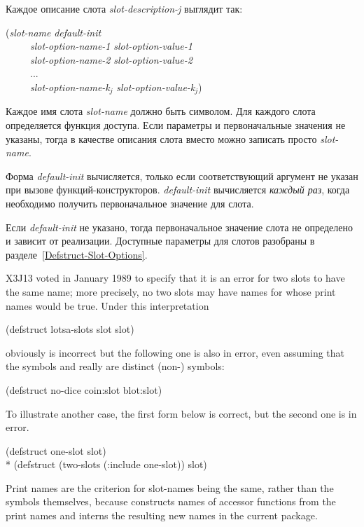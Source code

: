 \begin{defmac}
Каждое описание слота \emph{slot-description-j} выглядит так:
\begin{lisp}
(\emph{slot-name} \emph{default-init} \\
~~~~~\emph{slot-option-name-1} \emph{slot-option-value-1} \\
~~~~~\emph{slot-option-name-2} \emph{slot-option-value-2} \\
~~~~~... \\
~~~~~\emph{slot-option-name-k${}_{j}$} \emph{slot-option-value-k${}_{j}$})
\end{lisp}
Каждое имя слота \emph{slot-name} должно быть символом. Для каждого слота
определяется функция доступа. Если параметры и первоначальные значения не указаны,
тогда в качестве описания слота вместо  можно записать просто
\emph{slot-name}.

Форма \emph{default-init} вычисляется, только если соответствующий аргумент не
указан при вызове функций-конструкторов.
\emph{default-init} вычисляется \emph{каждый раз}, когда необходимо получить
первоначальное значение для слота.

Если \emph{default-init} не указано, тогда первоначальное значение слота не
определено и зависит от реализации. Доступные параметры для слотов разобраны в
разделе~\ref{Defstruct-Slot-Options}.

\begin{new}
X3J13 voted in January 1989
to specify that it is an error for
two slots to have the same name; more precisely, no two slots may
have names for whose print names  would be true.
Under this interpretation
\begin{lisp}
(defstruct lotsa-slots slot slot)
\end{lisp}
obviously is incorrect
but the following one is also in error, even assuming that the symbols
 and  really are distinct (non-) symbols:
\begin{lisp}
(defstruct no-dice coin:slot blot:slot)
\end{lisp}
To illustrate another case, the first  form below is
correct, but the second one is in error.
\begin{lisp}
(defstruct one-slot slot) \\*
(defstruct (two-slots (:include one-slot)) slot)
\end{lisp}

\beforenoterule
\begin{rationale}
Print names are the criterion for slot-names being the same, rather
than the symbols themselves, because  constructs names
of accessor functions from the print names and interns the resulting
new names in the current package.
\end{rationale}
\afternoterule


\end{new}
\end{defmac}
